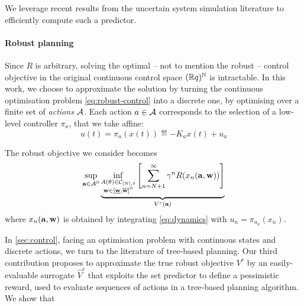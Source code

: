 \documentclass{article}
\begin{document}
We leverage recent results from the uncertain system simulation literature to efficiently compute such a predictor.

\paragraph{Robust planning}

Since $R$ is arbitrary, solving the optimal -- not to mention the robust -- control objective in the original continuous control space $(\mathbb{R} q)^{\mathbb{N}}$ is intractable.
In this work, we choose to approximate the solution by turning the continuous optimisation problem \eqref{eq:robust-control} into a discrete one, by optimising over a finite set of \emph{actions} $\mathcal{A}$. Each action $a\in\mathcal{A}$ corresponds to the selection of a low-level controller $\pi_a$, that we take affine:
\[u(t) = \pi_a(x(t)) \eqdef -K_a x(t) + u_a\]

The robust objective we consider becomes 
\begin{equation}
\label{eq:robust-control-disc}
\sup_{\mathbf{a}\in{\mathcal{A}}^{\mathbb{N}}} \underbrace{\inf_{\substack{A(\theta) \in \mathcal{C}_{[N],\delta} \\ \mathbf{w}\in[\underline{\mathbf{w}},\overline{\mathbf{w}}]^{\mathbb{N}}}} \left[\sum_{n=N+1}^\infty \gamma^n R(x_n(\mathbf{a},\mathbf{w}))\right]}_{V^r(\mathbf{a})}
\end{equation}
where $x_n(\mathbf{a}, \mathbf{w})$ is obtained by integrating \eqref{eq:dynamics} with $u_n = \pi_{a_n}(x_n)$.

In \autoref{sec:control}, facing an optimisation problem with continuous states and discrete actions, we turn to the literature of tree-based planning. Our third contribution proposes to approximate the true robust objective ${V}^r$ by an easily-evaluable surrogate $\hat{V}^r$ that exploits the set predictor to define a pessimistic reward, used to evaluate sequences of actions in a tree-based planning algorithm. We show that 





\end{document}
